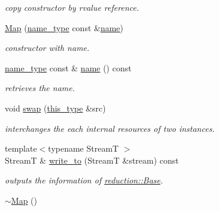 \begin{DoxyCompactItemize}
\begin{DoxyCompactList}\small\item\em copy constructor by rvalue reference. \end{DoxyCompactList}\item 
\hyperlink{classhryky_1_1reduction_1_1_map_a483018e7036b10955dd8b99283e27505}{Map} (\hyperlink{namespacehryky_1_1reduction_ac686c30a4c8d196bbd0f05629a6b921f}{name\-\_\-type} const \&\hyperlink{classhryky_1_1reduction_1_1_base_a842569265d741905eb8a353d3935f1d1}{name})
\begin{DoxyCompactList}\small\item\em constructor with name. \end{DoxyCompactList}\item 
\hypertarget{classhryky_1_1reduction_1_1_base_a842569265d741905eb8a353d3935f1d1}{\hyperlink{namespacehryky_1_1reduction_ac686c30a4c8d196bbd0f05629a6b921f}{name\-\_\-type} const \& \hyperlink{classhryky_1_1reduction_1_1_base_a842569265d741905eb8a353d3935f1d1}{name} () const }\label{classhryky_1_1reduction_1_1_base_a842569265d741905eb8a353d3935f1d1}

\begin{DoxyCompactList}\small\item\em retrieves the name. \end{DoxyCompactList}\item 
\hypertarget{classhryky_1_1reduction_1_1_map_a930aa9c043238a10680e3e9ddf3e2db1}{void \hyperlink{classhryky_1_1reduction_1_1_map_a930aa9c043238a10680e3e9ddf3e2db1}{swap} (\hyperlink{classhryky_1_1reduction_1_1_base_af02a7dee6042080b7380afd2f9500a42}{this\-\_\-type} \&src)}\label{classhryky_1_1reduction_1_1_map_a930aa9c043238a10680e3e9ddf3e2db1}

\begin{DoxyCompactList}\small\item\em interchanges the each internal resources of two instances. \end{DoxyCompactList}\item 
\hypertarget{classhryky_1_1reduction_1_1_base_a709cc7c48e1c90fe253739e46d82aa19}{{\footnotesize template$<$typename Stream\-T $>$ }\\Stream\-T \& \hyperlink{classhryky_1_1reduction_1_1_base_a709cc7c48e1c90fe253739e46d82aa19}{write\-\_\-to} (Stream\-T \&stream) const }\label{classhryky_1_1reduction_1_1_base_a709cc7c48e1c90fe253739e46d82aa19}

\begin{DoxyCompactList}\small\item\em outputs the information of \hyperlink{classhryky_1_1reduction_1_1_base}{reduction\-::\-Base}. \end{DoxyCompactList}\item 
\hypertarget{classhryky_1_1reduction_1_1_map_a3ce160bca5af690b2f78d8bd9acdfaf8}{\hyperlink{classhryky_1_1reduction_1_1_map_a3ce160bca5af690b2f78d8bd9acdfaf8}{$\sim$\-Map} ()}\label{classhryky_1_1reduction_1_1_map_a3ce160bca5af690b2f78d8bd9acdfaf8}


\end{DoxyCompactItemize}
